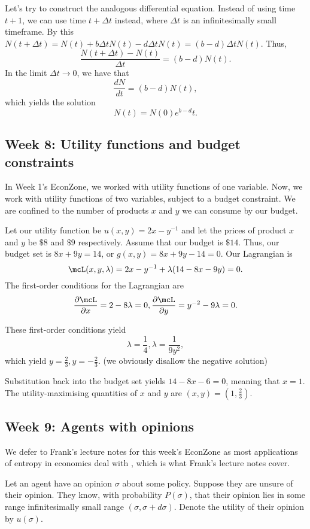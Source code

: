 \documentclass[a4paper, 12pt,oneside,openany]{book}
\begin{document}
Let's try to construct the analogous differential equation. Instead of using time $t+1$, we can use time $t+\Delta t$ instead, where $\Delta t$ is an infinitesimally small timeframe. By this $N(t+\Delta t)= N(t) + b\Delta t N(t) - d\Delta t N(t) = (b-d) \Delta t N(t)$. Thus, $$\frac{N(t+\Delta t) - N(t)}{\Delta t} = (b-d) N(t).$$ In the limit $\Delta t \to 0$, we have that $$\frac{dN}{dt} = (b-d)N(t),$$ which yields the solution $$N(t) = N(0) e^{b-d}t.$$

\subsection{Week 8: Utility functions and budget constraints}

In Week 1's EconZone, we worked with utility functions of one variable. Now, we work with utility functions of two variables, subject to a budget constraint. We are confined to the number of products $x$ and $y$ we can consume by our budget.

Let our utility function be $u(x, y)= 2x-y^{-1}$ and let the prices of product $x$ and $y$ be $\$8$ and $\$9$ respectively. Assume that our budget is $\$14$. Thus, our budget set is $8x+9y=14$, or $g(x, y) = 8x+9y-14=0$. Our Lagrangian is $$\mcL(x, y, \lambda) = 2x-y^{-1}+\lambda(14-8x-9y)=0.$$ The first-order conditions for the Lagrangian are $$\frac{\partial \mcL}{\partial x} = 2-8\lambda=0, \frac{\partial \mcL}{\partial y} = y^{-2}-9\lambda=0.$$ 

These first-order conditions yield $$\lambda=\frac{1}{4}, \lambda = \frac{1}{9y^2},$$ which yield $y=\frac{2}{3}, y=-\frac{2}{3}.$ (we obviously disallow the negative solution)

Substitution back into the budget set yields $14-8x-6=0$, meaning that $x=1$. The utility-maximising quantities of $x$ and $y$ are $(x, y) = (1, \frac{2}{3}).$ 

\subsection{Week 9: Agents with opinions} 

We defer to Frank's lecture notes for this week's EconZone as most applications of entropy in economics deal with , which is what Frank's lecture notes cover. 

Let an agent have an opinion $\sigma$ about some policy. Suppose they are unsure of their opinion. They know, with probability $P(\sigma)$, that their opinion lies in some range infinitesimally small range $(\sigma, \sigma+d\sigma)$. Denote the utility of their opinion by $u(\sigma)$.
\end{document}
